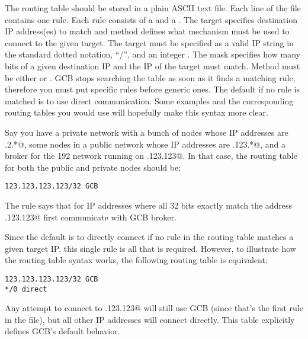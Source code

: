 
The routing table should be stored in a plain ASCII text file.
Each line of the file contains one rule.
Each rule consists of a  and a .
The target specifies destination IP address(es) to match and method
defines what mechanism must be used to connect to the given target.
The target must be specified as a valid IP string in the standard
dotted notation, ``/'', and an integer .
The mask specifies how many bits of a given destination IP and the IP
of the target must match.
Method must be either \verb@GCB@ or \verb@direct@.
GCB stops searching the table as soon as it finds a matching rule,
therefore you must put specific rules before generic ones.
The default if no rule is matched is to use direct communication.
Some examples and the corresponding routing tables you would use will
hopefully make this syntax more clear.



Say you have a private network with a bunch of nodes whose IP
addresses are .2.*@, some nodes in a public network 
whose IP addresses are .123.*@, and a broker for the 192
network running on .123.123@.
In that case, the routing table for both the public and private nodes
should be:

\begin{verbatim}
123.123.123.123/32 GCB
\end{verbatim}

The rule says that for IP addresses where all 32 bits exactly match
the address .123.123@ first communicate with GCB broker.

Since the default is to directly connect if no rule in the routing
table matches a given target IP, this single rule is all that is
required.
However, to illustrate how the routing table syntax works, the
following routing table is equivalent:

\begin{verbatim}
123.123.123.123/32 GCB
*/0 direct
\end{verbatim}

Any attempt to connect to .123.123@ will still use GCB
(since that's the first rule in the file), but all other IP addresses
will connect directly.
This table explicitly defines GCB's default behavior.

